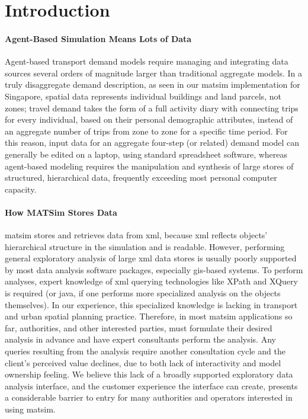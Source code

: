 \section{Introduction}
\label{sec:analyticsIntro}
\paragraph{Agent-Based Simulation Means Lots of Data}
Agent-based transport demand models require managing and integrating data sources several orders of magnitude larger than traditional aggregate models. In a truly disaggregate demand description, as seen in our \gls{matsim} implementation for Singapore, spatial data represents individual buildings and land parcels, not zones; travel demand takes the form of a full activity diary with connecting trips for every individual, based on their personal demographic attributes, instead of an aggregate number of trips from zone to zone for a specific time period. For this reason, input data for an aggregate four-step (or related) demand model can generally be edited on a laptop, using standard spreadsheet software, whereas agent-based modeling requires the manipulation and synthesis of large stores of structured, hierarchical data, frequently exceeding most personal computer capacity. %

\paragraph{How MATSim Stores Data}
\gls{matsim} stores and retrieves data from \gls{xml}, because \gls{xml} reflects objects' hierarchical structure in the simulation and is readable. However, performing general exploratory analysis of large \gls{xml} data stores is usually poorly supported by most data analysis software packages, especially \gls{gis}-based systems. To perform analyses, expert knowledge of \gls{xml} querying technologies like XPath and XQuery is required (or \gls{java}, if one performs more specialized analysis on the objects themselves). In our experience, this specialized knowledge is lacking in transport and urban spatial planning practice. Therefore, in most \gls{matsim} applications so far, authorities, and other interested parties, must formulate their desired analysis in advance and have expert consultants perform the analysis. Any queries resulting from the analysis require another consultation cycle and the client's perceived value declines, due to both lack of interactivity and model ownership feeling. We believe this lack of a broadly supported exploratory data analysis interface, and the customer experience the interface can create, presents a considerable barrier to entry for many authorities and operators interested in using \gls{matsim}.

